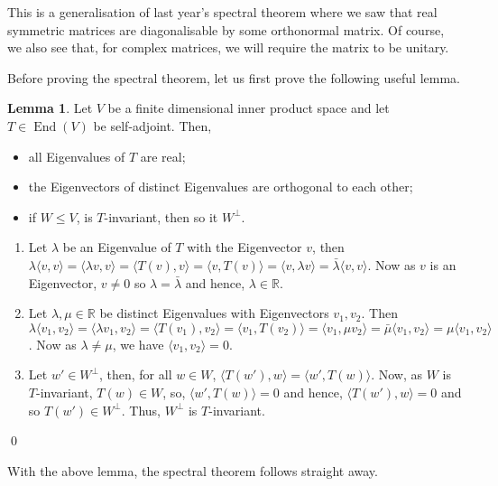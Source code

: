 \documentclass[
]{article}
\theoremstyle{definition}
\newtheorem{lemma}{Lemma}[section]
\theoremstyle{definition}
\begin{document}
This is a generalisation of last year's spectral theorem where we saw
that real symmetric matrices are diagonalisable by some orthonormal
matrix. Of course, we also see that, for complex matrices, we will
require the matrix to be unitary.

Before proving the spectral theorem, let us first prove the following
useful lemma.

\begin{lemma}\label{spectral_lemma}
  Let \(V\) be a finite dimensional inner product space and let \(T \in \mathop{\mathrm{End}}(V)\) 
  be self-adjoint. Then, 
  \begin{itemize}
    \item all Eigenvalues of \(T\) are real;
    \item the Eigenvectors of distinct Eigenvalues are orthogonal to each other;
    \item if \(W \le V\), is \(T\)-invariant, then so it \(W^\bot\).
  \end{itemize}
\end{lemma}
\proof \hfill
  \begin{enumerate}
    \item Let \(\lambda\) be an Eigenvalue of \(T\) with the Eigenvector \(v\), then 
      \(\lambda \langle v, v \rangle = \langle \lambda v, v \rangle = 
        \langle T(v), v \rangle = \langle v, T(v) \rangle = \langle v, \lambda v \rangle = 
        \bar{\lambda} \langle v, v \rangle\). Now as \(v\) is an Eigenvector, 
        \(v \neq 0\) so \(\lambda = \bar{\lambda}\) and hence, \(\lambda \in \mathbb{R}\).
    \item Let \(\lambda, \mu \in \mathbb{R}\) be distinct Eigenvalues with
      Eigenvectors \(v_1, v_2\). Then \(\lambda \langle v_1, v_2 \rangle = 
      \langle \lambda v_1, v_2 \rangle = \langle T(v_1), v_2 \rangle = 
      \langle v_1, T(v_2) \rangle = \langle v_1, \mu v_2 \rangle = 
      \bar{\mu} \langle v_1, v_2 \rangle = \mu \langle v_1, v_2 \rangle\). Now 
      as \(\lambda \neq \mu\), we have \(\langle v_1, v_2 \rangle = 0\).
    \item Let \(w' \in W^\bot\), then, for all \(w \in W\), 
      \(\langle T(w'), w \rangle = \langle w', T(w) \rangle\). Now, as \(W\) is 
      \(T\)-invariant, \(T(w) \in W\), so, \(\langle w', T(w) \rangle = 0\) and 
      hence,  \(\langle T(w'), w \rangle = 0\) and so \(T(w') \in W^\bot\). Thus, 
      \(W^\bot\) is \(T\)-invariant.
  \end{enumerate}
\qed

With the above lemma, the spectral theorem follows straight away.
\end{document}
